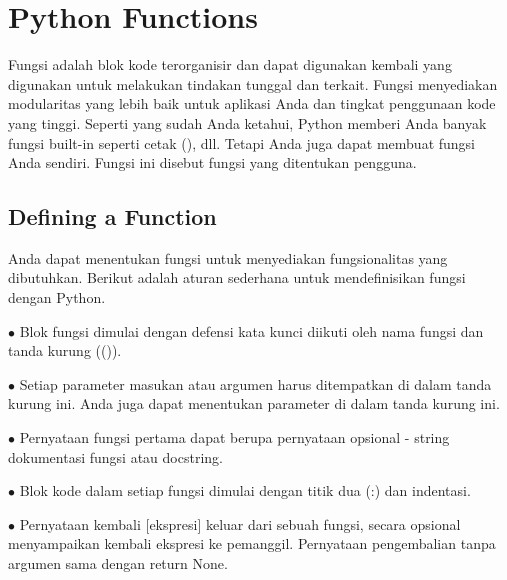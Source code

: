 \section{Python Functions}\par
Fungsi adalah blok kode terorganisir dan dapat digunakan kembali yang digunakan untuk melakukan tindakan tunggal dan terkait. Fungsi menyediakan modularitas yang lebih baik untuk aplikasi Anda dan tingkat penggunaan kode yang tinggi. Seperti yang sudah Anda ketahui, Python memberi Anda banyak fungsi built-in seperti cetak (), dll. Tetapi Anda juga dapat membuat fungsi Anda sendiri. Fungsi ini disebut fungsi yang ditentukan pengguna. \par

\subsection{Defining a Function} \par
 Anda dapat menentukan fungsi untuk menyediakan fungsionalitas yang dibutuhkan. Berikut adalah aturan sederhana untuk mendefinisikan fungsi dengan Python. \par
\noindent 
 $ \bullet $ Blok fungsi dimulai dengan defensi kata kunci diikuti oleh nama fungsi dan tanda kurung (()). \par
\noindent 
 $ \bullet $ Setiap parameter masukan atau argumen harus ditempatkan di dalam tanda kurung ini. Anda juga dapat menentukan parameter di dalam tanda kurung ini. \par
\noindent 
 $ \bullet $ Pernyataan fungsi pertama dapat berupa pernyataan opsional - string dokumentasi fungsi atau docstring. \par
\noindent 
 $ \bullet $ Blok kode dalam setiap fungsi dimulai dengan titik dua (:) dan indentasi. \par
\noindent 
 $ \bullet $ Pernyataan kembali [ekspresi] keluar dari sebuah fungsi, secara opsional menyampaikan kembali ekspresi ke pemanggil. Pernyataan pengembalian tanpa argumen sama dengan return None. \par
\vspace{12pt}
\noindent 

